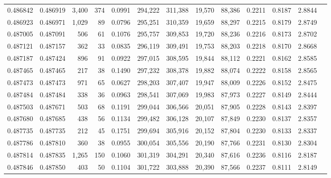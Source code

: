 \begin{tabular}{rrrrrrrrrrrrr}
0.486842 & 0.486919 & 3,400 &   374 &                                     0.0991 & 294,222 & 311,388 &  19,570 &  88,386 & 0.2211 & 0.8187 & 2.8844 \\
0.486923 & 0.486971 & 1,029 &    89 &                                     0.0796 & 295,251 & 310,359 &  19,659 &  88,297 & 0.2215 & 0.8179 & 2.8749 \\
0.487005 & 0.487091 &   506 &    61 &                                     0.1076 & 295,757 & 309,853 &  19,720 &  88,236 & 0.2216 & 0.8173 & 2.8702 \\
0.487121 & 0.487157 &   362 &    33 &                                     0.0835 & 296,119 & 309,491 &  19,753 &  88,203 & 0.2218 & 0.8170 & 2.8668 \\
0.487187 & 0.487424 &   896 &    91 &                                     0.0922 & 297,015 & 308,595 &  19,844 &  88,112 & 0.2221 & 0.8162 & 2.8585 \\
0.487465 & 0.487465 &   217 &    38 &                                     0.1490 & 297,232 & 308,378 &  19,882 &  88,074 & 0.2222 & 0.8158 & 2.8565 \\
0.487473 & 0.487473 &   971 &    65 &                                     0.0627 & 298,203 & 307,407 &  19,947 &  88,009 & 0.2226 & 0.8152 & 2.8475 \\
0.487484 & 0.487484 &   338 &    36 &                                     0.0963 & 298,541 & 307,069 &  19,983 &  87,973 & 0.2227 & 0.8149 & 2.8444 \\
0.487503 & 0.487671 &   503 &    68 &                                     0.1191 & 299,044 & 306,566 &  20,051 &  87,905 & 0.2228 & 0.8143 & 2.8397 \\
0.487680 & 0.487685 &   438 &    56 &                                     0.1134 & 299,482 & 306,128 &  20,107 &  87,849 & 0.2230 & 0.8137 & 2.8357 \\
0.487735 & 0.487735 &   212 &    45 &                                     0.1751 & 299,694 & 305,916 &  20,152 &  87,804 & 0.2230 & 0.8133 & 2.8337 \\
0.487786 & 0.487810 &   360 &    38 &                                     0.0955 & 300,054 & 305,556 &  20,190 &  87,766 & 0.2231 & 0.8130 & 2.8304 \\
0.487814 & 0.487835 & 1,265 &   150 &                                     0.1060 & 301,319 & 304,291 &  20,340 &  87,616 & 0.2236 & 0.8116 & 2.8187 \\
0.487846 & 0.487850 &   403 &    50 &                                     0.1104 & 301,722 & 303,888 &  20,390 &  87,566 & 0.2237 & 0.8111 & 2.8149 \\

\end{tabular}
